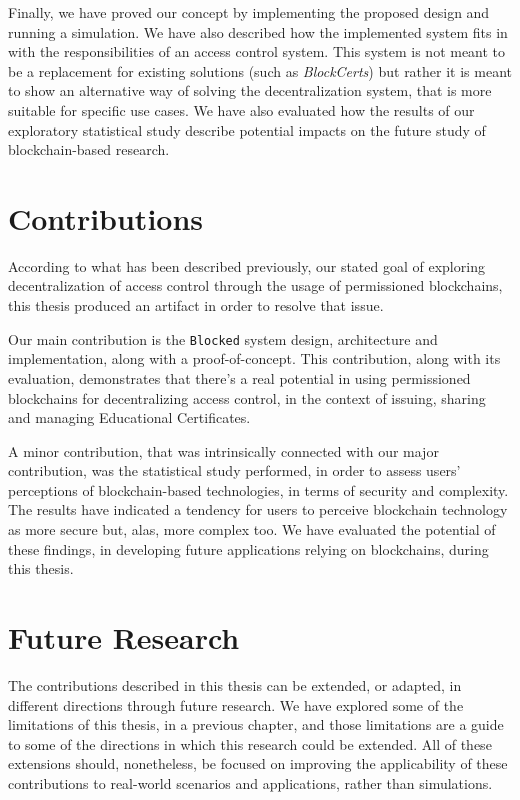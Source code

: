 Finally, we have proved our concept by implementing the proposed design and running a simulation. We have also described how the implemented system fits in with the responsibilities of an access control system. This system is not meant to be a replacement for existing solutions (such as \emph{BlockCerts}) but rather it is meant to show an alternative way of solving the decentralization system, that is more suitable for specific use cases. We have also evaluated how the results of our exploratory statistical study describe potential impacts on the future study of blockchain-based research.

\section{Contributions}

According to what has been described previously, our stated goal of exploring decentralization of access control through the usage of permissioned blockchains, this thesis produced an artifact in order to resolve that issue.

Our main contribution is the \texttt{Blocked} system design, architecture and implementation, along with a proof-of-concept. This contribution, along with its evaluation, demonstrates that there's a real potential in using permissioned blockchains for decentralizing access control, in the context of issuing, sharing and managing Educational Certificates.

A minor contribution, that was intrinsically connected with our major contribution, was the statistical study performed, in order to assess users' perceptions of blockchain-based technologies, in terms of security and complexity. The results have indicated a tendency for users to perceive blockchain technology as more secure but, alas, more complex too. We have evaluated the potential of these findings, in developing future applications relying on blockchains, during this thesis.

\section{Future Research}

The contributions described in this thesis can be extended, or adapted, in different directions through future research. We have explored some of the limitations of this thesis, in a previous chapter, and those limitations are a guide to some of the directions in which this research could be extended. All of these extensions should, nonetheless, be focused on improving the applicability of these contributions to real-world scenarios and applications, rather than simulations.

